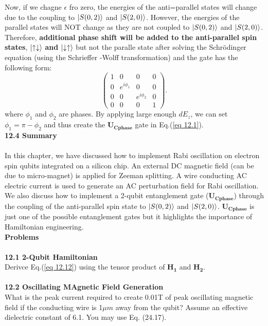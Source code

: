 \documentclass{article}
\begin{document}
Now, if we chagne $\epsilon$ fro zero, the energies of the anti=parallel states will change
due to the coupling to $\ket{S(0,2)}$ and $\ket{S(2,0)}$. However, the energies of the parallel
states will NOT change as they are not coupled to $\ket{S(0,2)}$ and $\ket{S(2,0)}$. Therefore,
\textbf{additional phase shift will be added to the anti-parallel spin states}, $\ket{\uparrow\downarrow}$ \textbf{and}
$\ket{\downarrow\uparrow}$ but not the paralle state after solving the Schr\"{o}dinger equation (using the Schrieffer
-Wolff transformation) and the gate has the following form:
\begin{equation}\label{eq 12.14}
  \begin{pmatrix}
    1&0&0&0\\0&e^{i\phi_1}&0&0\\0&0&e^{i\phi_2}&0\\0&0&0&1
  \end{pmatrix}.\tag{12.14}
\end{equation}
where $\phi_1$ and $\phi_2$ are phases. By applying large enough $dE_z$, we can set $\phi_1=
\pi-\phi_2$ and thus create the $\boldsymbol{U_{Cphase}}$ gate in Eq.(\ref{eq 12.1}).
\\[20pt]
\textbf{\large 12.4 Summary}
\\\\
In this chapter, we have discussed how to implement Rabi oscillation on electron spin qubits integrated on a silicon chip.
An external DC magnetic field (can be due to micro-magnet) is applied for Zeeman splitting. A wire conducting
AC electric current is used to generate an AC perturbation field for Rabi oscillation. We also discuss
how to implement a 2-qubit entanglement gate ($\boldsymbol{U_{Cphase}}$) through the coupling of the anti-parallel
spin state to $\ket{S(0,2)}$ and $\ket{S(2,0)}$. $\boldsymbol{U_{Cphase}}$ is just one of the possible
entanglement gates but it highlights the importance of Hamiltonian engineering.
\\[20pt]
\textbf{\large Problems}
\\\\
\textbf{12.1 2-Qubit Hamiltonian}\\
Derivce Eq.(\ref{eq 12.12}) using the tensor product of $\boldsymbol{H_1}$ and $\boldsymbol{H_2}$.
\\\\
\textbf{12.2 Oscillating MAgnetic Field Generation}
\\
What is the peak current required to create 0.01T of peak oscillating magnetic field
if the conducting wire is 1$\mu m$ away from the qubit? Assume an effective dielectric constant
of 6.1. You may use Eq. (24.17).

\printbibliography
\end{document}
